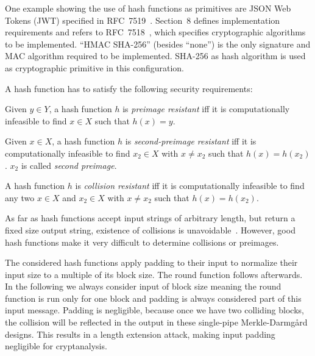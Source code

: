 One example showing the use of hash functions as primitives are JSON Web Tokens (JWT)
specified in RFC~7519~\cite{rfc7519}. Section~8 defines implementation requirements
and refers to RFC~7518~\cite{rfc7518}, which specifies cryptographic algorithms to
be implemented. \enquote{HMAC SHA-256} (besides \enquote{none}) is the only signature
and MAC algorithm required to be implemented.
SHA-256 as hash algorithm is used as cryptographic primitive in this configuration.

A hash function has to satisfy the following security requirements:

\begin{defi}
  Given $y \in Y$,
  a hash function $h$ is \emph{preimage resistant} iff it is computationally infeasible
  to find $x \in X$ such that $h(x) = y$.
\end{defi}

\begin{defi}
  Given $x \in X$,
  a hash function $h$ is \emph{second-preimage resistant} iff it is computationally infeasible
  to find $x_2 \in X$ with $x \neq x_2$ such that $h(x) = h(x_2)$.
  $x_2$ is called \emph{second preimage}.
\end{defi}

\begin{defi}
  A hash function $h$ is \emph{collision resistant} iff it is computationally infeasible to
  find any two $x \in X$ and $x_2 \in X$ with $x \neq x_2$ such that $h(x) = h(x_2)$.
\end{defi}

As far as hash functions accept input strings of arbitrary length, but return a fixed
size output string, existence of collisions is unavoidable~\cite{schlaffer}.
However, good hash functions make it very difficult to determine collisions or preimages.

The considered hash functions apply padding to their input to normalize their
input size to a multiple of its block size. The round function follows afterwards.
In the following we always consider input of block size meaning the round function
is run only for one block and padding is always considered part of this input message.
Padding is negligible, because once we have two colliding blocks,
the collision will be reflected in the output in these single-pipe Merkle-Darmg\aa rd designs.
This results in a length extension attack, making input padding negligible for cryptanalysis.

